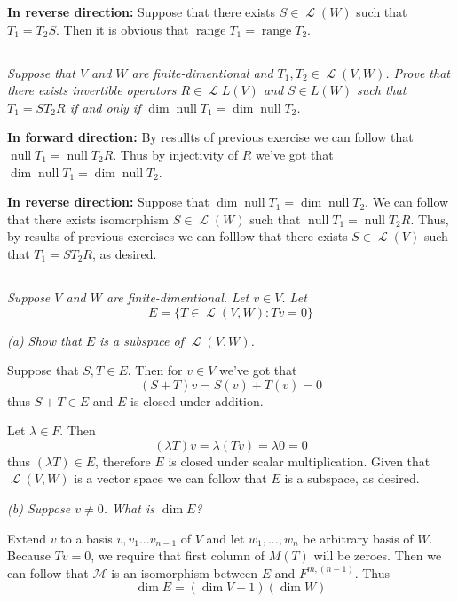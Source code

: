 \documentclass[11pt,oneside,titlepage]{book}
\DeclareMathOperator \map {\mathcal {L}}
\DeclareMathOperator \ns {null}
\DeclareMathOperator \range {range}
\begin{document}
\textbf{In reverse direction: }
Suppose that there exists $S \in \map (W)$ such that $T_1 = T_2 S$. Then it is obvious that
$\range T_1 = \range T_2$.

\subsection{}

\textit{Suppose that $V$ and $W$ are finite-dimentional and $T_1, T_2 \in \map (V, W)$. Prove that
  there exists invertible operators $R \in \map L(V)$ and $S \in L(W)$ such that
  $T_1 = S T_2 R$ if and only if $\dim \ns T_1 = \dim \ns T_2$.}

\textbf{In forward direction: }
By resullts of previous exercise we can follow that $\ns T_1 = \ns T_2 R$.
Thus by injectivity of $R$ we've got that $\dim \ns T_1 = \dim \ns T_2$.

\textbf{In reverse direction: }
Suppose that $\dim \ns T_1 = \dim \ns T_2$. We can follow that there exists isomorphism
$S \in \map (W)$ such that $\ns T_1 = \ns T_2 R$. Thus, by results of previous exercises we
can folllow that there exists $S \in \map (V)$ such that $T_1 = S T_2 R$, as desired.

\subsection{}

\textit{Suppose $V$ and $W$ are finite-dimentional. Let $v \in V$. Let }
$$E = \{T \in \map(V, W): Tv = 0 \}$$

\textit{(a) Show that $E$ is a subspace of $\map (V, W)$.}

Suppose that $S, T \in E$. Then for $v \in V$ we've got that 
$$(S + T)v = S(v) + T(v) = 0$$
thus $S + T \in E$ and $E$ is closed under addition.

Let $\lambda \in F$.  Then
$$(\lambda T)v = \lambda (T v) = \lambda 0 = 0$$
thus $(\lambda T) \in E$, therefore $E$ is closed under scalar multiplication. Given that
$\map (V, W)$ is a vector space we can follow that $E$ is a subspace, as desired.

\textit{(b) Suppose $v \neq 0$. What is $\dim E$?}

Extend $v$ to a basis $v, v_1 ... v_{n - 1}$  of $V$ and let $w_1, ..., w_n$ be
arbitrary basis of $W$. Because $Tv = 0$, we require that first column  of $M(T)$ will be
zeroes. Then we can follow that $\mathcal M$ is an
isomorphism between $E$ and $F^{m, (n - 1)}$. Thus
$$\dim E = (\dim V - 1)(\dim W)$$
\end{document}
